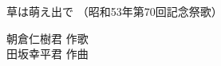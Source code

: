 \documentclass[10pt,b5j]{tarticle} %
\begin{document}
\begin{minipage}[c]{0.7\hsize} %
    \begin{center}
        {\LARGE
            草は萌え出で %
        }
        {\small 
            （昭和53年第70回記念祭歌） %
        }
    \end{center}
\end{minipage}
\begin{minipage}[c]{0.3\hsize} %
    \begin{flushright} %
        朝倉仁樹君 作歌\\田坂幸平君 作曲 %
    \end{flushright}
\end{minipage}
\end{document}
